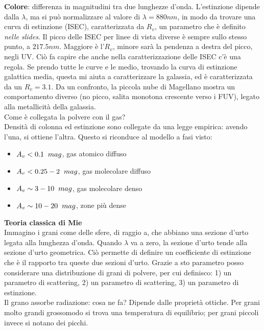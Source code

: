 \textbf{Colore}: differenza in magnitudini tra due lunghezze d'onda.
L'estinzione dipende dalla $\lambda$, ma si può normalizzare al valore di $\lambda = 880nm$, in modo da trovare una curva di estinzione (ISEC), caratterizzata da $R_{v}$, un parametro che è definito \textit{nelle slides}.
Il picco delle ISEC per linee di vista diverse è sempre sullo stesso punto, a $217.5nm$. Maggiore è l'$R_{v}$, minore sarà la pendenza a destra del picco, negli UV. 
Ciò fa capire che anche nella caratterizzazione delle ISEC c'è una regola.
Se prendo tutte le curve e le medio, trovando la curva di estinzione galattica media, questa mi aiuta a caratterizzare la galassia, ed è caratterizzata da un $R_{v} = 3.1$.
Da un confronto, la piccola nube di Magellano mostra un comportamento diverso (no picco, salita monotona crescente verso i FUV), legato alla metallicità della galassia.
\\Come è collegata la polvere con il gas?\\
Densità di colonna ed estinzione sono collegate da una legge empirica: avendo l'una, si ottiene l'altra.
Questo si riconduce al modello a fasi visto: 
\begin{itemize}
    \item $A_{v}<0.1\hspace{0.2cm}mag$, gas atomico diffuso
    \item $A_{v}<0.25 - 2\hspace{0.2cm} mag$, gas molecolare diffuso
    \item $A_{v}\sim 3-10 \hspace{0.2cm}mag$, gas molecolare denso
    \item $A_{v}\sim10 - 20 \hspace{0.2cm}mag$, zone più dense
\end{itemize}
\textbf{Teoria classica di Mie}\\
Immagino i grani come delle sfere, di raggio a, che abbiano una sezione d'urto legata alla lunghezza d'onda. Quando $\lambda$ va a zero, la sezione d'urto tende alla sezione d'urto geometrica.
Ciò permette di definire un coefficiente di estinzione che è il rapporto tra queste due sezioni d'urto. Grazie a sto parametro posso considerare una distribuzione di grani di polvere, per cui definisco: 1) un parametro di scattering, 2) un parametro di scattering, 3) un parametro di estinzione.\\
Il grano assorbe radiazione: cosa ne fa? Dipende dalle proprietà ottiche.
Per grani molto grandi grossomodo si trova una temperatura di equilibrio; per grani piccoli invece si notano dei picchi.
